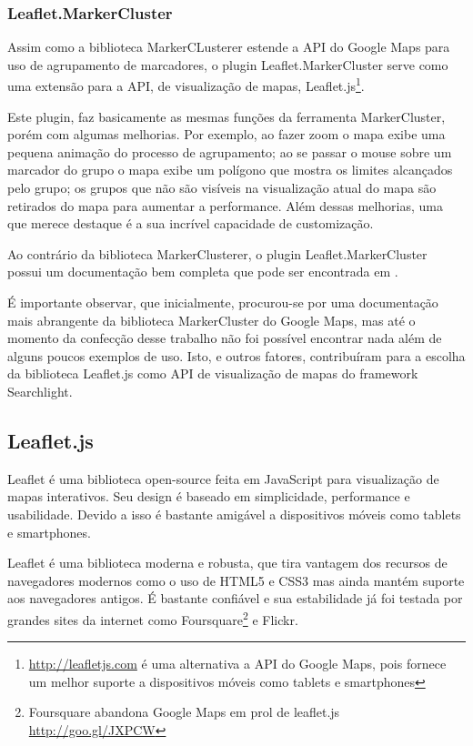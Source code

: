 		\subsubsection{Leaflet.MarkerCluster}
		Assim como a biblioteca MarkerCLusterer estende a API do Google Maps para uso de agrupamento de marcadores, o plugin Leaflet.MarkerCluster serve como uma extensão para a API, de visualização de mapas, Leaflet.js\footnote{\url{http://leafletjs.com} é uma alternativa  a API do Google Maps, pois fornece um melhor suporte a dispositivos móveis como tablets e smartphones }. 
		
		Este plugin, faz basicamente as mesmas funções da ferramenta MarkerCluster, porém com algumas melhorias. Por exemplo, ao fazer zoom o mapa exibe uma pequena animação do processo de agrupamento; ao se passar o mouse sobre um marcador do grupo o mapa exibe um polígono que mostra os limites alcançados pelo grupo; os grupos que não são visíveis  na visualização atual do mapa são retirados do mapa para aumentar a performance. Além dessas melhorias, uma que merece destaque é a sua incrível capacidade de customização. 

		Ao contrário da biblioteca MarkerClusterer, o plugin Leaflet.MarkerCluster possui um documentação bem completa que pode ser encontrada em \cite{gitleafletmarker}. 
		
		É importante observar, que inicialmente, procurou-se por uma documentação mais abrangente da biblioteca MarkerCluster do Google Maps, mas até o momento da confecção desse trabalho não foi possível encontrar nada além de alguns poucos exemplos de uso. Isto, e outros fatores, contribuíram para a escolha da biblioteca Leaflet.js como API de visualização de mapas do framework Searchlight.
		  
\subsection{Leaflet.js}
Leaflet é uma biblioteca open-source feita em JavaScript para visualização de mapas interativos. Seu design é baseado em simplicidade, performance e usabilidade. Devido a isso é bastante amigável a dispositivos móveis como tablets e smartphones.

Leaflet é uma biblioteca moderna e robusta, que tira vantagem dos recursos de navegadores modernos como o uso de HTML5  e CSS3 mas ainda mantém suporte aos navegadores antigos.  É bastante confiável e sua estabilidade já foi testada por grandes sites da internet como Foursquare\footnote{Foursquare abandona Google Maps em prol de leaflet.js \url{http://goo.gl/JXPCW}} e Flickr.

